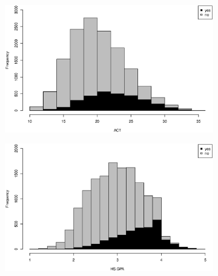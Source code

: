 \documentclass[12pt,english]{report}
\begin{document}
\begin{figure}[p]
\medskip
\begin{subfigure}{0.48\textwidth}
\includegraphics[width=\linewidth]{pic/grad_act}
\caption{} \label{grad:c}
\end{subfigure}\hspace*{\fill}
\begin{subfigure}{0.48\textwidth}
\includegraphics[width=\linewidth]{pic/grad_gpa}
\caption{} \label{grad:d}
\end{subfigure}


\end{figure}
\end{document}
